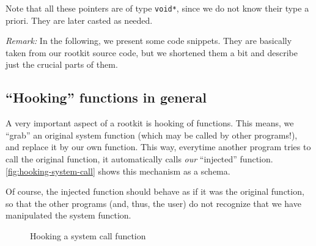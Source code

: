 \documentclass[10pt, letterpaper]{article}
\begin{document}
Note that all these pointers are of type \texttt{void*}, since we do not know their type a priori. They are later casted as needed.

\emph{Remark:} In the following, we present some code snippets. They are basically taken from our rootkit source code, but we shortened them a bit and describe just the crucial parts of them.

\subsection{``Hooking'' functions in general}

A very important aspect of a rootkit is hooking of functions. This means, we ``grab'' an original system function (which may be called by other programs!), and replace it by our own function. This way, everytime another program tries to call the original function, it automatically calls \emph{our} ``injected'' function. \autoref{fig:hooking-system-call} shows this mechanism as a schema.

Of course, the injected function should behave as if it was the original function, so that the other programs (and, thus, the user) do not recognize that we have manipulated the system function.

\begin{figure}[ht]
  \centering
  \caption{Hooking a system call function}
  \label{fig:hooking-system-call}
\end{figure}
\end{document}

